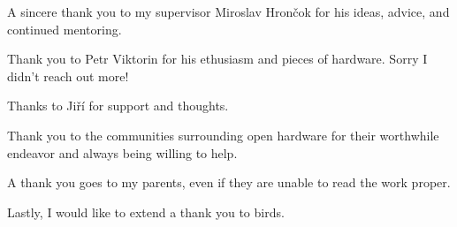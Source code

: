 A sincere thank you to my supervisor Miroslav Hrončok for his ideas, advice, and continued mentoring.

Thank you to Petr Viktorin for his ethusiasm and pieces of hardware.  Sorry I didn't reach out more!

Thanks to Jiří for support and thoughts.

Thank you to the communities surrounding open hardware for their worthwhile endeavor and always being willing to help.

A thank you goes to my parents, even if they are unable to read the work proper.

Lastly, I would like to extend a thank you to birds.

